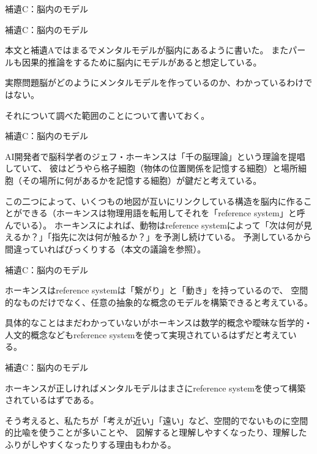 \documentclass[12pt, unicode]{beamer}
\begin{document}
\begin{frame}
{\LARGE 補遺C：脳内のモデル}
\end{frame}

\begin{frame}{補遺C：脳内のモデル}

本文と補遺Aではまるでメンタルモデルが脳内にあるように書いた。
またパールも因果的推論をするために脳内にモデルがあると想定している。

実際問題脳がどのようにメンタルモデルを作っているのか、わかっているわけではない。

それについて調べた範囲のことについて書いておく。

\end{frame}

\begin{frame}{補遺C：脳内のモデル}

AI開発者で脳科学者のジェフ・ホーキンスは「千の脳理論」という理論を提唱していて、
彼はどうやら格子細胞（物体の位置関係を記憶する細胞）と場所細胞（その場所に何があるかを記憶する細胞）が鍵だと考えている。

この二つによって、いくつもの地図が互いにリンクしている構造を脳内に作ることができる（ホーキンスは物理用語を転用してそれを「reference system」と呼んでいる）。
ホーキンスによれば、動物はreference systemによって「次は何が見えるか？」「指先に次は何が触るか？」を予測し続けている。
予測しているから間違っていればびっくりする（本文の議論を参照）。

\end{frame}

\begin{frame}{補遺C：脳内のモデル}

ホーキンスはreference systemは「繋がり」と「動き」を持っているので、
空間的なものだけでなく、任意の抽象的な概念のモデルを構築できると考えている。

具体的なことはまだわかっていないがホーキンスは数学的概念や曖昧な哲学的・人文的概念などもreference systemを使って実現されているはずだと考えている。

\end{frame}
\begin{frame}{補遺C：脳内のモデル}

ホーキンスが正しければメンタルモデルはまさにreference systemを使って構築されているはずである。

そう考えると、私たちが「考えが近い」「遠い」など、空間的でないものに空間的比喩を使うことが多いことや、
図解すると理解しやすくなったり、理解したふりがしやすくなったりする理由もわかる。

\end{frame}
\end{document}
